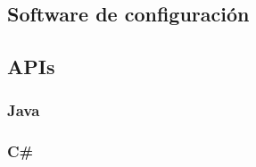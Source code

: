 \subsection{Software de configuración}



\subsection{APIs}
	
	\subsubsection{Java}

	\subsubsection{C\#}
    